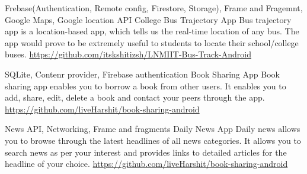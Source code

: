 \begin{cventries}
	\cventry
	{Frebase(Authentication, Remote config, Firestore, Storage), Frame and Fragemnt, Google Maps, Google location API}
	{College Bus Trajectory App}
	{}
	{}
	{Bus trajectory app is a location-based app, which tells us the real-time location of any bus. The app would prove to be extremely useful to students to locate their school/college buses. \newline \vspace{1mm}
	\url{https://github.com/itskshitizsh/LNMIIT-Bus-Track-Android}}

	\cventry
	{SQLite, Contenr provider, Firebase authentication}
	{Book Sharing App}
	{}
	{}
	{Book sharing app enables you to borrow a book from other users. It enables you to add, share, edit, delete a book and contact your peers through the app. \newline \vspace{1mm}
	\url{https://github.com/liveHarshit/book-sharing-android}}

	\cventry
	{News API, Networking, Frame and fragments}
	{Daily News App}
	{}
	{}
	{Daily news allows you to browse through the latest headlines of all news categories. It allows you to search news as per your interest and provides links to detailed articles for the headline of your choice. \newline \vspace{1mm}
	\url{https://github.com/liveHarshit/book-sharing-android}}
	
\end{cventries}